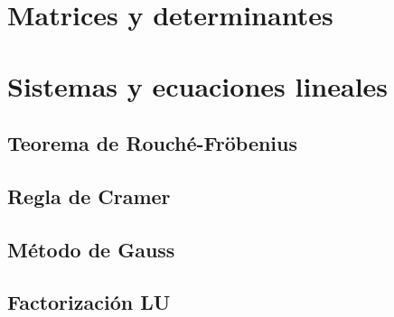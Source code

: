 \documentclass[0_algebra.tex]{subfiles}
\begin{document}
\section{Matrices y determinantes}

\section{Sistemas y ecuaciones lineales}
\subsection{Teorema de Rouché-Fröbenius}
\subsection{Regla de Cramer}
\subsection{Método de Gauss}
\subsection{Factorización LU}
\end{document}
